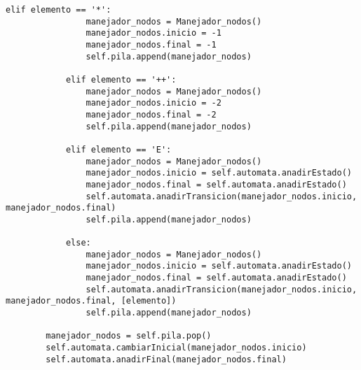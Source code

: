 \begin{lstlisting}[frame=single]
            elif elemento == '*':
                manejador_nodos = Manejador_nodos()
                manejador_nodos.inicio = -1
                manejador_nodos.final = -1
                self.pila.append(manejador_nodos)

            elif elemento == '++':
                manejador_nodos = Manejador_nodos()
                manejador_nodos.inicio = -2
                manejador_nodos.final = -2
                self.pila.append(manejador_nodos)

            elif elemento == 'E':
                manejador_nodos = Manejador_nodos()
                manejador_nodos.inicio = self.automata.anadirEstado()
                manejador_nodos.final = self.automata.anadirEstado()
                self.automata.anadirTransicion(manejador_nodos.inicio, manejador_nodos.final)
                self.pila.append(manejador_nodos)

            else:
                manejador_nodos = Manejador_nodos()
                manejador_nodos.inicio = self.automata.anadirEstado()
                manejador_nodos.final = self.automata.anadirEstado()
                self.automata.anadirTransicion(manejador_nodos.inicio, manejador_nodos.final, [elemento])
                self.pila.append(manejador_nodos)

        manejador_nodos = self.pila.pop()
        self.automata.cambiarInicial(manejador_nodos.inicio)
        self.automata.anadirFinal(manejador_nodos.final)



\end{lstlisting}
